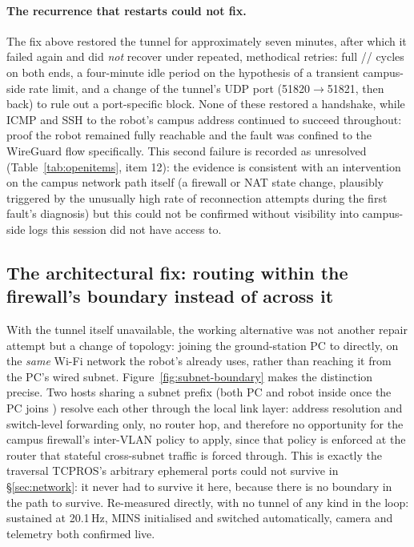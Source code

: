 \paragraph{The recurrence that restarts could not fix.} The fix above
restored the tunnel for approximately seven minutes, after which it failed
again and did \emph{not} recover under repeated, methodical retries: full
// cycles on both ends, a four-minute
idle period on the hypothesis of a transient campus-side rate limit, and a
change of the tunnel's UDP port (\num{51820}$\to$\num{51821}, then back)
to rule out a port-specific block. None of these restored a handshake, while
ICMP and SSH to the robot's campus address continued to succeed throughout: proof the robot remained fully reachable and the fault was confined to
the WireGuard flow specifically. This second failure is recorded as
unresolved (Table~\ref{tab:openitems}, item 12): the evidence is consistent
with an intervention on the campus network path itself (a firewall or NAT
state change, plausibly triggered by the unusually high rate of
reconnection attempts during the first fault's diagnosis) but this could
not be confirmed without visibility into campus-side logs this session did
not have access to.

\subsection{The architectural fix: routing within the firewall's boundary instead of across it}
\label{sec:samesubnet}
With the tunnel itself unavailable, the working alternative was not another
repair attempt but a change of topology: joining the ground-station PC to
 directly, on the \emph{same} Wi-Fi network the robot's
 already uses, rather than reaching it from the PC's wired
subnet. Figure~\ref{fig:subnet-boundary} makes the distinction precise.
Two hosts sharing a subnet prefix (both PC and robot inside
 once the PC joins ) resolve each
other through the local link layer: address resolution and
switch-level forwarding only, no router hop, and therefore no
opportunity for the campus firewall's inter-VLAN policy to apply, since
that policy is enforced at the router that stateful cross-subnet traffic is
forced through. This is exactly the traversal TCPROS's arbitrary ephemeral
ports could not survive in \S\ref{sec:network}: it never had to survive it
here, because there is no boundary in the path to survive. Re-measured
directly, with no tunnel of any kind in the loop: 
sustained at 20.1\,Hz, MINS initialised and switched automatically, camera
and telemetry both confirmed live.


